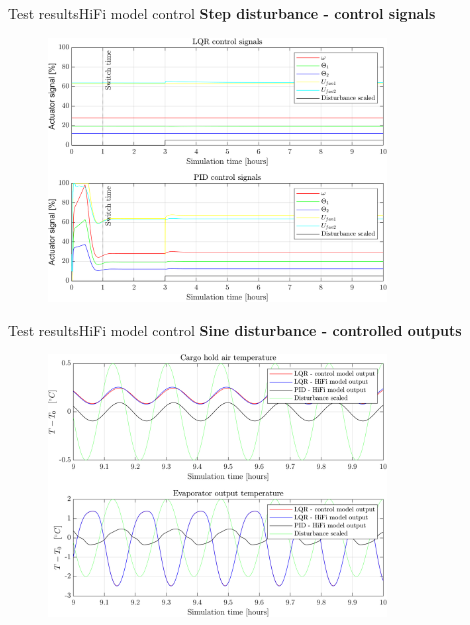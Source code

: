 \begin{frame}{Test results}{HiFi model control}
	\textbf{Step disturbance - control signals}
	\begin{figure}[H]
		\centering
		\includegraphics[width=0.8\textwidth]{../Graphics/fig_inputs_stepDist.png}
	\end{figure}
\end{frame}



\begin{frame}{Test results}{HiFi model control}
	\textbf{Sine disturbance - controlled outputs}
	\begin{figure}[H]
		\centering
		\includegraphics[width=0.8\textwidth]{../Graphics/fig_LQRvsKresten_sineDist_zoom.png}
	\end{figure} 
\end{frame}



